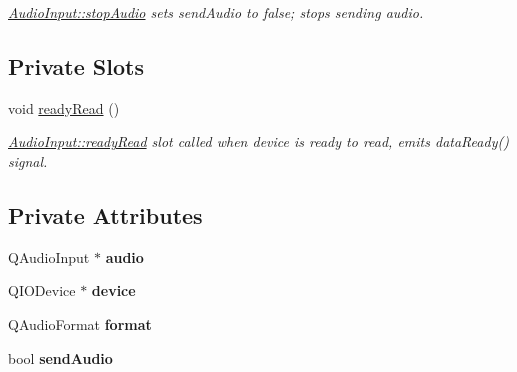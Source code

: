\begin{DoxyCompactItemize}
\begin{DoxyCompactList}\small\item\em \hyperlink{class_audio_input_a90062672a92bb9250de567e1746913c7}{Audio\+Input\+::stop\+Audio} sets send\+Audio to false; stops sending audio. \end{DoxyCompactList}\end{DoxyCompactItemize}
\subsection*{Private Slots}
\begin{DoxyCompactItemize}
\item 
\hypertarget{class_audio_input_adb78a37081a55c5187a1fe320ddd7266}{void \hyperlink{class_audio_input_adb78a37081a55c5187a1fe320ddd7266}{ready\+Read} ()}\label{class_audio_input_adb78a37081a55c5187a1fe320ddd7266}

\begin{DoxyCompactList}\small\item\em \hyperlink{class_audio_input_adb78a37081a55c5187a1fe320ddd7266}{Audio\+Input\+::ready\+Read} slot called when device is ready to read, emits data\+Ready() signal. \end{DoxyCompactList}\end{DoxyCompactItemize}
\subsection*{Private Attributes}
\begin{DoxyCompactItemize}
\item 
\hypertarget{class_audio_input_a51ba924ef3bdd93191890e76fe822e27}{Q\+Audio\+Input $\ast$ {\bfseries audio}}\label{class_audio_input_a51ba924ef3bdd93191890e76fe822e27}

\item 
\hypertarget{class_audio_input_a80188cedce4de076c4072b3c460fef6c}{Q\+I\+O\+Device $\ast$ {\bfseries device}}\label{class_audio_input_a80188cedce4de076c4072b3c460fef6c}

\item 
\hypertarget{class_audio_input_a05d2d3b1c013ae5e407b306ca4ffe43c}{Q\+Audio\+Format {\bfseries format}}\label{class_audio_input_a05d2d3b1c013ae5e407b306ca4ffe43c}

\item 
\hypertarget{class_audio_input_ad139df9556fcff32cfc42dfd8560e850}{bool {\bfseries send\+Audio}}\label{class_audio_input_ad139df9556fcff32cfc42dfd8560e850}

\end{DoxyCompactItemize}


